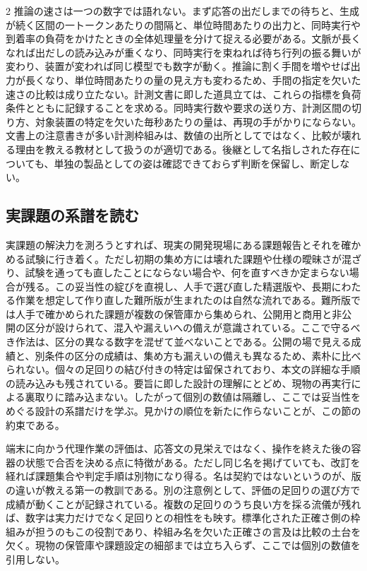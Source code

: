 \documentclass[lualatex,a4paper,10pt]{jlreq}
\begin{document}
\begin{multicols}{2}
\raggedcolumns
推論の速さは一つの数字では語れない。まず応答の出だしまでの待ちと、生成が続く区間の一トークンあたりの間隔と、単位時間あたりの出力と、同時実行や到着率の負荷をかけたときの全体処理量を分けて捉える必要がある\autocite{mlperf,genaiperf}。文脈が長くなれば出だしの読み込みが重くなり、同時実行を束ねれば待ち行列の振る舞いが変わり、装置が変われば同じ模型でも数字が動く。推論に割く手間を増やせば出力が長くなり、単位時間あたりの量の見え方も変わるため、手間の指定を欠いた速さの比較は成り立たない。計測文書に即した道具立ては、これらの指標を負荷条件とともに記録することを求める\autocite{genaiperf}。同時実行数や要求の送り方、計測区間の切り方、対象装置の特定を欠いた毎秒あたりの量は、再現の手がかりにならない。文書上の注意書きが多い計測枠組みは、数値の出所としてではなく、比較が壊れる理由を教える教材として扱うのが適切である\autocite{llmperf}。後継として名指しされた存在についても、単独の製品としての姿は確認できておらず判断を保留し、断定しない。

\subsection{実課題の系譜を読む}
実課題の解決力を測ろうとすれば、現実の開発現場にある課題報告とそれを確かめる試験に行き着く\autocite{swebench}。ただし初期の集め方には壊れた課題や仕様の曖昧さが混ざり、試験を通っても直したことにならない場合や、何を直すべきか定まらない場合が残る。この妥当性の綻びを直視し、人手で選び直した精選版や、長期にわたる作業を想定して作り直した難所版が生まれたのは自然な流れである\autocite{swepro}。難所版では人手で確かめられた課題が複数の保管庫から集められ、公開用と商用と非公開の区分が設けられて、混入や漏えいへの備えが意識されている。ここで守るべき作法は、区分の異なる数字を混ぜて並べないことである。公開の場で見える成績と、別条件の区分の成績は、集め方も漏えいの備えも異なるため、素朴に比べられない。個々の足回りの結び付きの特定は留保されており、本文の詳細な手順の読み込みも残されている。要旨に即した設計の理解にとどめ、現物の再実行による裏取りに踏み込まない。したがって個別の数値は隔離し、ここでは妥当性をめぐる設計の系譜だけを学ぶ。見かけの順位を新たに作らないことが、この節の約束である。

端末に向かう代理作業の評価は、応答文の見栄えではなく、操作を終えた後の容器の状態で合否を決める点に特徴がある\autocite{tbench}。ただし同じ名を掲げていても、改訂を経れば課題集合や判定手順は別物になり得る。名は契約ではないというのが、版の違いが教える第一の教訓である。別の注意例として、評価の足回りの選び方で成績が動くことが記録されている。複数の足回りのうち良い方を採る流儀が残れば、数字は実力だけでなく足回りとの相性をも映す。標準化された正確さ側の枠組みが担うのもこの役割であり\autocite{lmharness}、枠組み名を欠いた正確さの言及は比較の土台を欠く。現物の保管庫や課題設定の細部までは立ち入らず、ここでは個別の数値を引用しない。


\end{multicols}
\end{document}
